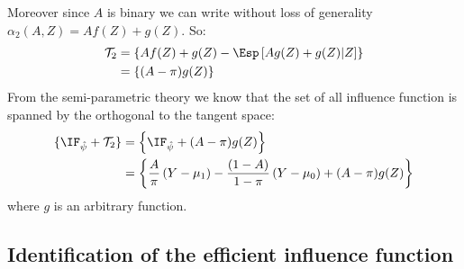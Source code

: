 \documentclass[12pt]{article}
\newcommand\Tspace{\mathcal{T}}
\begin{document}
Moreover since \(A\) is binary we can write without loss of generality
\(\alpha_2(A,Z)=Af(Z)+g(Z)\). So:
\begin{align*}
\Tspace_2 &= \left\{Af(Z) + g(Z) - \Esp\left[ Ag(Z) + g(Z) | Z \right] \right\} \\
          &= \left\{(A-\pi)g(Z)  \right\} 
\end{align*}
From the semi-parametric theory we know that the set of all influence
function is spanned by the orthogonal to the tangent space:
\begin{align*}
\{\IF_{\hat{\psi}} + \Tspace_2 \} &= \left\{\IF_{\hat{\psi}} + (A-\pi)g(Z)  \right\}  \\
&= \left\{\frac{A}{\pi} \left(Y - \mu_1\right) - \frac{(1-A)}{1-\pi}\left(Y - \mu_0\right) + (A-\pi)g(Z)  \right\}  
\end{align*}
where \(g\) is an arbitrary function.

\subsection{Identification of the efficient influence function}
\label{sec:orgb3bc48a}
\end{document}
